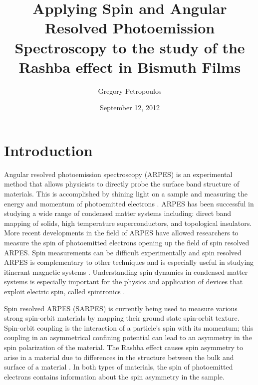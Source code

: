 \documentclass[12pt]{article}
\begin{document}
\title{Applying Spin and Angular Resolved Photoemission Spectroscopy to the study of the Rashba effect in Bismuth Films}
\author{Gregory Petropoulos}
\date{September 12, 2012}
\maketitle
{}

\section{Introduction}
Angular resolved photoemission spectroscopy (ARPES) is an experimental method that allows physicists to directly probe the surface band structure of materials.
This is accomplished by shining light on a sample and measuring the energy and momentum of photoemitted electrons \cite{Damascelli}.
ARPES has been successful in studying a wide range of condensed matter systems including:  direct band mapping of solids,  high temperature superconductors, and topological insulators.
More recent developments in the field of ARPES have allowed researchers to measure the spin of photoemitted electrons \cite{Dil, Osterwalder} opening up the field of spin resolved ARPES.
Spin measurements can be difficult experimentally and spin resolved ARPES is complementary to other techniques and is especially useful in studying itinerant magnetic systems \cite{Osterwalder}.
Understanding spin dynamics in condensed matter systems is especially important for the physics and application of devices that exploit electric spin, called spintronics \cite{wolf}.

Spin resolved ARPES (SARPES) is currently being used to measure various strong spin-orbit materials by mapping their ground state spin-orbit texture.
Spin-orbit coupling is the interaction of a particle's spin with its momentum; this coupling in an asymmetrical confining potential can lead to an asymmetry in the spin polarization of the material.
The Rashba effect causes spin asymmetry to arise in a material due to differences in the structure between the bulk and surface of a material \cite{Dil}.
In both types of materials, the spin of photoemitted electrons contains information about the spin asymmetry in the sample.
\end{document}
